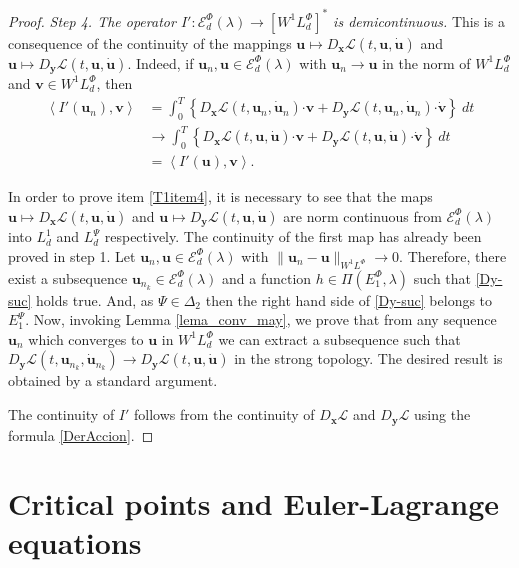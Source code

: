 \documentclass[twoside]{elsarticle}
\theoremstyle{remark}
\newcommand{\lphi}{L^{\Phi}}
\newcommand{\lpsi}{L^{\Psi}}
\newcommand{\ephi}{E^{\Phi}}
\newcommand{\wphi}{W^{1}\lphi}
\newcommand{\sobnor}{\|_{W^{1}\lphi}}
\newcommand{\domi}{\mathcal{E}^{\Phi}_d(\lambda)}
\renewcommand{\b}[1]{\boldsymbol{#1}}
\newcommand{\ccdot}{\b{\cdot}}
\newcommand{\epsi}{E^{\Psi}}
\begin{document}
\begin{proof}
\emph{Step 4. The operator $I':\domi  \to \left[\wphi_d
\right]^* $ is demicontinuous.}
This is a consequence  of the continuity of the mappings $\b{u} \mapsto D_{\b{x}}\mathcal{L}(t,\b{u},\b{\dot{u}})$ and $\b{u} \mapsto
D_{\b{y}}\mathcal{L}(t,\b{u},\b{\dot{u}})$. Indeed, if $\b{u}_n,\b{u}\in \domi$ with $\b{u}_n\to \b{u}$ in the norm of $\wphi_d$ and $\b{v} \in
\wphi_d$, then
\[
\begin{split}
\left\langle  I'(\b{u}_{n}),\b{v} \right\rangle &= \int_0^T \left\{  D_{\b{x}}\mathcal{L}\left(t,\b{u}_n,\b{\dot{u}}_n\right)\ccdot
\b{v} +
 D_{\b{y}}\mathcal{L}\left(t,\b{u}_n,\b{\dot{u}}_n\right)\ccdot\b{\dot{v}}\right\} \ dt\\
&\rightarrow \int_0^T \left\{ D_{\b{x}}\mathcal{L}\left(t,\b{u},\b{\dot{u}}\right)\ccdot \b{v}+ 
D_{\b{y}}\mathcal{L}\left(t,\b{u},\b{\dot{u}}\right)\ccdot\b{\dot{v}}\right\} \ dt\\
&=\left\langle  I'(\b{u}),\b{v} \right\rangle.
\end{split}
\]


In order to prove item  \ref{T1item4}, it is necessary to see that the maps $\b{u}\mapsto D_{\b{x}}\mathcal{L}(t,\b{u},\b{\dot{u}})$  and $\b{u}\mapsto D_{\b{y}}\mathcal{L}(t,\b{u},\b{\dot{u}})$  are norm continuous
from $\domi $ into $L^1_d$ and
 $\lpsi_d$ respectively.  The continuity of the first map has already been proved in step 1. 
Let $\b{u}_n, \b{u} \in \domi$ with $\|\b{u}_n- \b{u}\sobnor\to 0$. Therefore,   there exist a subsequence $\b{u}_{n_k}\in \domi$ and a function $h\in\Pi(\ephi_1,\lambda)$  such that   \eqref{Dy-suc} holds true. 
And, as  $\Psi\in\Delta_2$ then   the right hand side of  \eqref{Dy-suc} belongs to $\epsi_1$. 
Now, invoking  Lemma \ref{lema_conv_may}, we  prove that
  from any sequence $\b{u}_n$ which converges to $\b{u}$ in $\wphi_d$ we can
extract a subsequence such that   $D_{\b{y}}\mathcal{L}(t,\b{u}_{n_k},\b{\dot{u}}_{n_k})\to D_{\b{y}}\mathcal{L}(t,\b{u},\b{\dot{u}})$ in the strong topology. The desired result is obtained by a standard argument.

The continuity of $I'$  follows  from the continuity 
of $D_{\b{x}}\mathcal{L}$ and $D_{\b{y}}\mathcal{L}$ using the formula \eqref{DerAccion}.
\end{proof}



\section{Critical points and Euler-Lagrange equations}\label{sec:equa-min}
\end{document}
